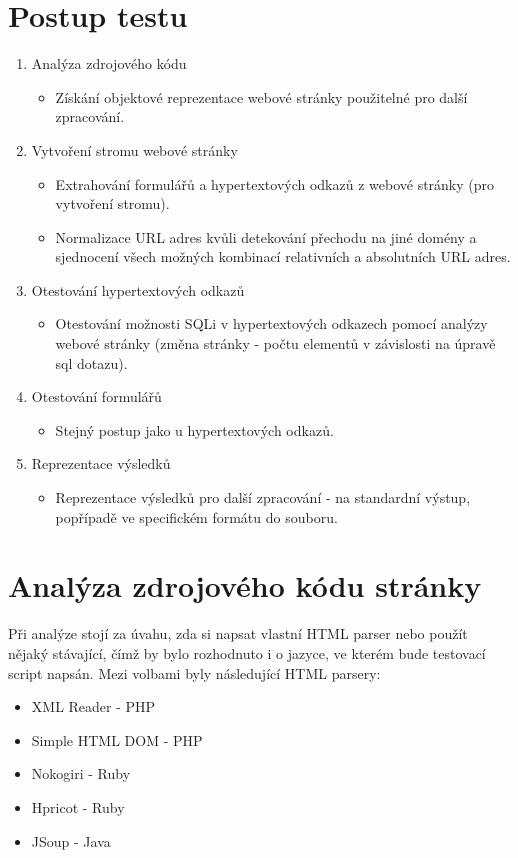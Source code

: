 \documentclass[12pt, a4paper]{report}
\begin{document}
\section{Postup testu}
\begin{enumerate}
\item Analýza zdrojového kódu 
\begin{itemize}
\item Získání objektové reprezentace webové stránky použitelné pro další zpracování.
\end{itemize}
\item Vytvoření stromu webové stránky
\begin{itemize}
\item Extrahování formulářů a hypertextových odkazů z webové stránky (pro vytvoření stromu).
\item Normalizace URL adres kvůli detekování přechodu na jiné domény a sjednocení všech možných kombinací relativních a absolutních URL adres.
\end{itemize}
\item Otestování hypertextových odkazů
\begin{itemize}
\item Otestování možnosti SQLi v hypertextových odkazech pomocí analýzy webové stránky (změna stránky - počtu elementů v závislosti na úpravě sql dotazu).
\end{itemize}
\item Otestování formulářů
\begin{itemize}
\item Stejný postup jako u hypertextových odkazů.
\end{itemize}
\item Reprezentace výsledků
\begin{itemize}
\item Reprezentace výsledků pro další zpracování - na standardní výstup, popřípadě ve specifickém formátu do souboru.
\end{itemize}
\end{enumerate}

\section{Analýza zdrojového kódu stránky}
Při analýze stojí za úvahu, zda si napsat vlastní HTML parser nebo použít nějaký stávající, čímž by bylo rozhodnuto i o jazyce, ve kterém bude testovací script napsán. Mezi volbami byly následující HTML parsery:
\begin{itemize}
\item XML Reader - PHP
\item Simple HTML DOM - PHP
\item Nokogiri - Ruby
\item Hpricot - Ruby
\item JSoup - Java
\end{itemize}
\end{document}
